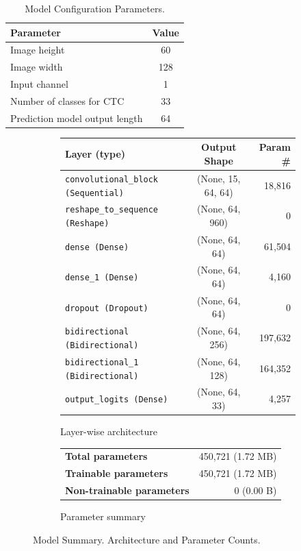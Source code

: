 \documentclass[11pt,letterpaper]{article}
\begin{document}
	\begin{table}[!h]
		\centering
		\begin{tabular}{|l|c|}
			\hline
			\textbf{Parameter} & \textbf{Value} \\
			\hline
			Image height & 60 \\
			Image width & 128 \\
			Input channel & 1 \\
			Number of classes for CTC & 33 \\
			Prediction model output length & 64 \\
			\hline
		\end{tabular}
		\caption{Model Configuration Parameters.}
		\label{tab:model_config}
	\end{table}
	
	\begin{figure}[!h]
		\centering
		\begin{subfigure}[b]{0.75\linewidth}
			\centering
			\begin{tabular}{|l|c|r|}
				\hline
				\textbf{Layer (type)} & \textbf{Output Shape} & \textbf{Param \#} \\
				\hline
				\texttt{convolutional\_block (Sequential)} & (None, 15, 64, 64) & 18,816 \\
				\texttt{reshape\_to\_sequence (Reshape)} & (None, 64, 960) & 0 \\
				\texttt{dense (Dense)} & (None, 64, 64) & 61,504 \\
				\texttt{dense\_1 (Dense)} & (None, 64, 64) & 4,160 \\
				\texttt{dropout (Dropout)} & (None, 64, 64) & 0 \\
				\texttt{bidirectional (Bidirectional)} & (None, 64, 256) & 197,632 \\
				\texttt{bidirectional\_1 (Bidirectional)} & (None, 64, 128) & 164,352 \\
				\texttt{output\_logits (Dense)} & (None, 64, 33) & 4,257 \\
				\hline
			\end{tabular}
			\caption{Layer-wise architecture}
			\label{tab:architecture}
		\end{subfigure}
		
		\vspace{1em}
	
		\begin{subfigure}[b]{0.75\linewidth}
			\centering
			\begin{tabular}{|l|r|}
				\hline
				\textbf{Total parameters} & 450,721 (1.72 MB) \\
				\textbf{Trainable parameters} & 450,721 (1.72 MB) \\
				\textbf{Non-trainable parameters} & 0 (0.00 B) \\
				\hline
			\end{tabular}
			\caption{Parameter summary}
		\end{subfigure}
		
		\caption{Model Summary. Architecture and Parameter Counts.}
		\label{fig:model_summary}
	\end{figure}
	
\end{document}
